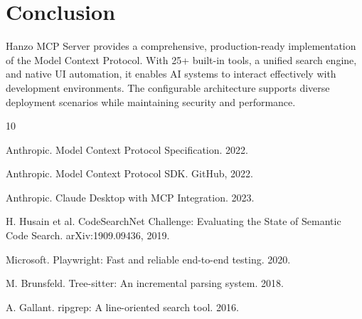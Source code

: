 \section{Conclusion}


Hanzo MCP Server provides a comprehensive, production-ready implementation of the Model Context Protocol. With 25+ built-in tools, a unified search engine, and native UI automation, it enables AI systems to interact effectively with development environments. The configurable architecture supports diverse deployment scenarios while maintaining security and performance.


\begin{thebibliography}{10}

Anthropic. Model Context Protocol Specification. 2022.

Anthropic. Model Context Protocol SDK. GitHub, 2022.

Anthropic. Claude Desktop with MCP Integration. 2023.

H. Husain et al. CodeSearchNet Challenge: Evaluating the State of Semantic Code Search. arXiv:1909.09436, 2019.

Microsoft. Playwright: Fast and reliable end-to-end testing. 2020.

M. Brunsfeld. Tree-sitter: An incremental parsing system. 2018.

A. Gallant. ripgrep: A line-oriented search tool. 2016.

\end{thebibliography}

